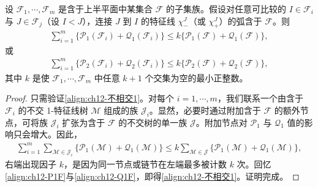 \documentclass[../../main.tex]{subfiles}
\begin{document}
\begin{lemma}\label{lemma:ch12-不相交求和}
设 $\mathscr{F}_1,\cdots,\mathscr{F}_m$ 是含于上半平面中某集合 $\mathscr{F}$ 的子集族。假设对任意可比较的 $I\in\mathscr{F}_i$ 与 $J\in\mathscr{F}_j$（设 $I<J$），连接 $J$ 到 $I$ 的特征线 $\chi_-^J$（或 $\chi_+^J$）的弧含于 $\mathscr{F}$。则
\begin{align}
\sum_{i=1}^m\{\mathscr{P}_1(\mathscr{F}_i)+\mathscr{Q}_1(\mathscr{F}_i)\}\leqslant k\{\mathscr{P}_1(\mathscr{F})+\mathscr{Q}_1(\mathscr{F})\},
\label{align:ch12-不相交1}
\end{align}
或
\begin{align}
\sum_{i=1}^m\{\mathscr{P}_2(\mathscr{F}_i)+\mathscr{Q}_2(\mathscr{F}_i)\}\leqslant k\{\mathscr{P}_2(\mathscr{F})+\mathscr{Q}_2(\mathscr{F})\},
\label{align:ch12-不相交2}
\end{align}
其中 $k$ 是使 $\mathscr{F}_1,\cdots,\mathscr{F}_m$ 中任意 $k+1$ 个交集为空的最小正整数。
\end{lemma}

\begin{proof}
只需验证\eqref{align:ch12-不相交1}。对每个 $i=1,\cdots,m$，我们联系一个由含于 $\mathscr{F}_i$ 的不交 1-特征线树 $\mathscr{M}$ 组成的族 $\mathscr{J}_i$。显然，必要时通过附加含于 $\mathscr{F}$ 的额外节点，可将族 $\mathscr{J}_i$ 扩张为含于 $\mathscr{F}$ 的不交树的单一族 $\mathscr{J}$。附加节点对 $\mathscr{P}_1$ 与 $\mathscr{Q}_1$ 值的影响只会增大。因此，
\begin{align}
\sum_{i=1}^m\sum_{\mathscr{M}\in\mathscr{J}_i}\{\mathscr{P}_1(\mathscr{M})+\mathscr{Q}_1(\mathscr{M})\}\leqslant k\sum_{\mathscr{M}\in\mathscr{J}}\{\mathscr{P}_1(\mathscr{M})+\mathscr{Q}_1(\mathscr{M})\},
\label{align:ch12-不相交证明}
\end{align}
右端出现因子 $k$，是因为同一节点或链节在左端最多被计数 $k$ 次。回忆\eqref{align:ch12-P1F}与\eqref{align:ch12-Q1F}，即得\eqref{align:ch12-不相交1}。证明完成。
\end{proof}
\end{document}
